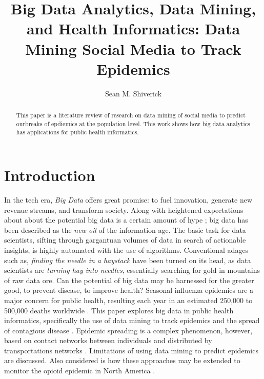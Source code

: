 \documentclass[sigconf]{acmart}
\begin{document}
\title{Big Data Analytics, Data Mining, and Health Informatics: 
Data Mining Social Media to Track Epidemics}
\author{Sean M. Shiverick}


\begin{abstract}
This paper is a literature review of research on data mining of social 
media to predict ourbreaks of epdiemics at the population level. This work
shows how big data analytics has applications for public health informatics.
\end{abstract}



\maketitle

\section{Introduction}

In the tech era, \textit{Big Data} offers great promise: to fuel innovation, 
generate new revenue streams, and transform society. Along with heightened 
expectations about about the potential big data is a certain amount of hype 
\cite{gupta15}; big data has been described as the \textit{new oil} of the 
information age.  The basic task for data scientists, sifting through 
gargantuan volumes of data in search of actionable insights, is highly automated 
with the use of algorithms. Conventional adages such as, \textit{finding the 
needle in a haystack} have been turned on its head, as data scientists are 
\textit{turning hay into needles}, essentially searching for gold in mountains 
of raw data ore. Can the potential of big data may be harnessed for the greater 
good, to prevent disease, to improve health? Seasonal influenza epidemics are 
a major concern for public health, resulting each year in an estimated 250,000 
to 500,000 deaths worldwide \cite{who17}. This paper explores big data in public 
health informatics, specifically the use of data mining to track epidemics and 
the spread of contagious disease \cite{hay13}. Epidemic spreading is a complex 
phenomenon, however, based on contact networks between individuals and distributed
by transportations networks \cite{Colizza06}. Limitations of using data mining 
to predict epidemics are discussed. Also considered is how these approaches may 
be extended to monitor the opioid epidemic in North America \cite{volkow14}.
\end{document}
